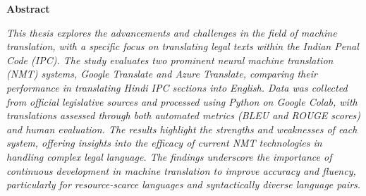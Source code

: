 \clearpage

\vfill
\begin{center}
    \textbf{\Large Abstract}
\end{center}

\vspace{1cm}

\noindent

\textit{This thesis explores the advancements and challenges in the field of machine translation, with a specific focus on translating legal texts within the Indian Penal Code (IPC). The study evaluates two prominent neural machine translation (NMT) systems, Google Translate and Azure Translate, comparing their performance in translating Hindi IPC sections into English. Data was collected from official legislative sources and processed using Python on Google Colab, with translations assessed through both automated metrics (BLEU and ROUGE scores) and human evaluation. The results highlight the strengths and weaknesses of each system, offering insights into the efficacy of current NMT technologies in handling complex legal language. The findings underscore the importance of continuous development in machine translation to improve accuracy and fluency, particularly for resource-scarce languages and syntactically diverse language pairs.}
\vfill
\clearpage